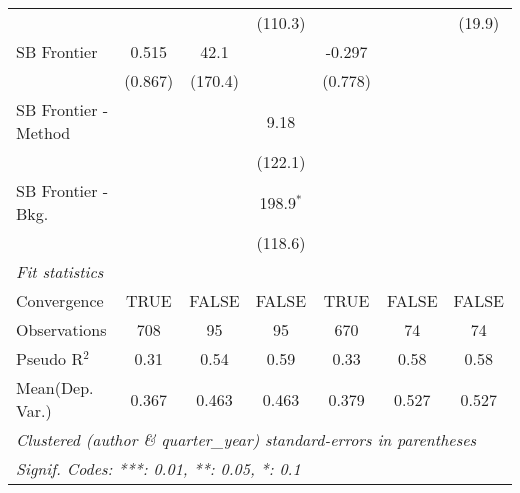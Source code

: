 \begin{tabular}{lcccccc}
                        &         &           & (110.3)       &         &               & (19.9)\\   
   SB Frontier          & 0.515   & 42.1      &               & -0.297  &               &   \\   
                        & (0.867) & (170.4)   &               & (0.778) &               &   \\   
   SB Frontier - Method &         &           & 9.18          &         &               &   \\   
                        &         &           & (122.1)       &         &               &   \\   
   SB Frontier - Bkg.   &         &           & 198.9$^{*}$   &         &               &   \\   
                        &         &           & (118.6)       &         &               &   \\   
   \midrule
   \emph{Fit statistics}\\
   Convergence          &TRUE     & FALSE     & FALSE         & TRUE    & FALSE         & FALSE\\  
   Observations         & 708     & 95        & 95            & 670     & 74            & 74\\  
   Pseudo R$^2$         & 0.31    & 0.54      & 0.59          & 0.33    & 0.58          & 0.58\\  
Mean(Dep. Var.) & 0.367 & 0.463 & 0.463 & 0.379 & 0.527 & 0.527 \\
   \midrule \midrule
   \multicolumn{7}{l}{\emph{Clustered (author \& quarter\_year) standard-errors in parentheses}}\\
   \multicolumn{7}{l}{\emph{Signif. Codes: ***: 0.01, **: 0.05, *: 0.1}}\\
\end{tabular}
\par\endgroup
